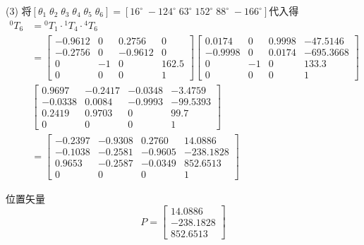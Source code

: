 \documentclass[UTF8, 13pt]{ctexart}
\begin{document}
(3)
将\([\theta_1 \; \theta_2 \; \theta_3 \; \theta_4 \; \theta_5 \; \theta_6] = [16^\circ \; -124^\circ \; 63^\circ \; 152^\circ \; 88^\circ \; -166^\circ]\)代入得
\[
\begin{aligned}
{}^0T_6 &= {}^0T_1 \cdot {}^1T_4 \cdot {}^4T_6 \\
        &= \begin{bmatrix}
            -0.9612 & 0 & 0.2756 & 0 \\
            -0.2756 & 0 & -0.9612 & 0 \\
            0 & -1 & 0 & 162.5 \\
            0 & 0 & 0 & 1
            \end{bmatrix}
            \begin{bmatrix}
            0.0174 & 0 & 0.9998 & -47.5146 \\
            -0.9998 & 0 & 0.0174 & -695.3668 \\
            0 & -1 & 0 & 133.3 \\
            0 & 0 & 0 & 1
            \end{bmatrix} \\
            &\begin{bmatrix}
            0.9697 & -0.2417 & -0.0348 & -3.4759 \\
            -0.0338 & 0.0084 & -0.9993 & -99.5393 \\
            0.2419 & 0.9703 & 0 & 99.7 \\
            0 & 0 & 0 & 1
            \end{bmatrix} \\
        &= \begin{bmatrix}
            -0.2397 & -0.9308 & 0.2760 & 14.0886 \\
            -0.1038 & -0.2581 & -0.9605 & -238.1828 \\
            0.9653 & -0.2587 & -0.0349 & 852.6513 \\
            0 & 0 & 0 & 1
            \end{bmatrix}
\end{aligned}
\]
\vspace{0.5em}

位置矢量
\[
P = \begin{bmatrix}
    14.0886 \\ -238.1828 \\ 852.6513 
    \end{bmatrix}
\]
\end{document}
